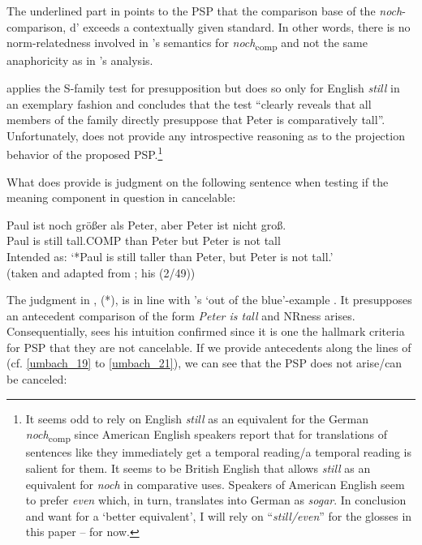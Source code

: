 \documentclass[output=paper,
modfonts
]{langscibook}
\begin{document}
The underlined part in  points to the PSP that the comparison base of the \textit{noch}-comparison, d' exceeds a contextually given standard. In other words, there is no norm-relatedness involved in \citeauthor{Hofstetter2013}'s semantics for \textit{noch}\textsubscript{comp} and not the same anaphoricity as in \citeauthor{umbach2009a_comp}'s \citeyearpar{umbach2009a_comp} analysis.

\citeauthor{Hofstetter2013} applies the S-family test \citep{kadmon2001} for presupposition but does so only for English \textit{still} in an exemplary fashion and concludes that the test ``clearly reveals that all members of the family directly presuppose that Peter is comparatively tall''. Unfortunately, \citeauthor{Hofstetter2013} does not provide any introspective reasoning as to the projection behavior of the proposed PSP.\footnote{ It seems odd to rely on English \textit{still} as an equivalent for the German \textit{noch}\textsubscript{comp} since American English speakers report that for translations of sentences like  they immediately get a temporal reading/a temporal reading is salient for them. It seems to be British English that allows \textit{still} as an equivalent for \textit{noch} in comparative uses. Speakers of American English seem to prefer \textit{even} which, in turn, translates into German as \textit{sogar}. In conclusion and want for a `better equivalent', I will rely on ``\textit{still\slash even}'' for the glosses in this paper -- for now.}

What \citeauthor{Hofstetter2013} does provide is judgment on the following sentence when testing if the meaning component in question in cancelable:

\ea\gll *Paul ist noch größer als Peter, aber Peter ist nicht groß.\\
       Paul is still tall.COMP than Peter but Peter is not tall\\
\glt   Intended as: {`*Paul is still taller than Peter, but Peter is not tall.'} \\ (taken and adapted from \citealt[p.27]{Hofstetter2013}; his (2/49)) \label{hofstetter_ABER_peter_nicht_gross}
\z

\noindent The judgment in , (*), is in line with \citeauthor{umbach2009a_comp}'s \citeyearpar{umbach2009a_comp} `out of the blue'-example . It presupposes an antecedent comparison of the form \textit{Peter is tall} and NRness arises. Consequentially, \citet{Hofstetter2013} sees his intuition confirmed since it is one the hallmark criteria for PSP that they are not cancelable. If we provide antecedents along the lines of \citeauthor{umbach2009a_comp} (cf. \ref{umbach_19} to \ref{umbach_21}), we can see that the PSP does not arise/can be canceled: 
\end{document}

